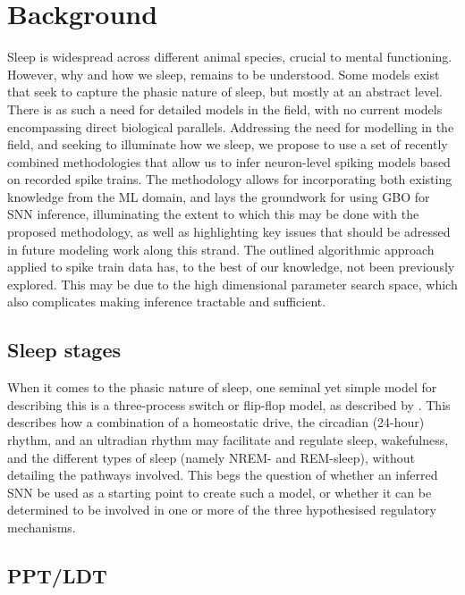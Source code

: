 \documentclass[mphil,deptreport,ianc]{infthesis} %
\begin{document}
\section{Background}

Sleep is widespread across different animal species, crucial to mental functioning. 
However, why and how we sleep, remains to be understood. 
Some models exist that seek to capture the phasic nature of sleep, but mostly at an abstract level. 
There is as such a need for detailed models in the field, with no current models encompassing direct biological parallels. Addressing the need for modelling in the field, and seeking to illuminate how we sleep, we propose to use a set of recently combined methodologies that allow us to infer neuron-level spiking models based on recorded spike trains. 
The methodology allows for incorporating both existing knowledge from the ML domain, and lays the groundwork for using GBO for SNN inference, illuminating the extent to which this may be done with the proposed methodology, as well as highlighting key issues that should be adressed in future modeling work along this strand.
The outlined algorithmic approach applied to spike train data has, to the best of our knowledge, not been previously explored. 
This may be due to the high dimensional parameter search space, which also complicates making inference tractable and sufficient.

\subsection{Sleep stages}

When it comes to the phasic nature of sleep, one seminal yet simple model for describing this is a three-process switch or flip-flop model, as described by \cite{Borbely1992}.
This describes how a combination of a homeostatic drive, the circadian (24-hour) rhythm, and an ultradian rhythm may facilitate and regulate sleep, wakefulness, and the different types of sleep (namely NREM- and REM-sleep), without detailing the pathways involved.
This begs the question of whether an inferred SNN be used as a starting point to create such a model, or whether it can be determined to be involved in one or more of the three hypothesised regulatory mechanisms.

\subsection{PPT/LDT}
\end{document}
